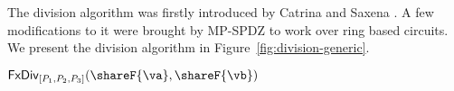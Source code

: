 \label{subsec:division}




The division algorithm was firstly introduced by Catrina and Saxena \cite{FC:CatSax10}.
A few modifications to it were brought by MP-SPDZ to work over ring based circuits.
We present the division algorithm in Figure~\ref{fig:division-generic}.

\msubsubsection
  {$\mathsf{FxDiv}_{[P_1, P_2, P_3]}(\shareF{\va}, \shareF{\vb})$}

